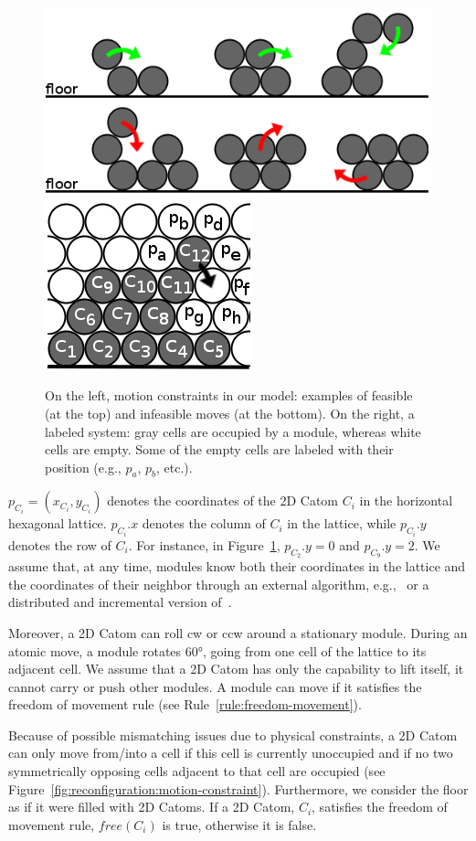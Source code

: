\begin{figure}[!h]
	\centering
	\includegraphics[width=.6\linewidth]{images/reconfiguration/constraints}
	\hfill
	\includegraphics[width=.37\linewidth]{images/reconfiguration/named-system}
	\caption{On the left, motion constraints in our model: examples of feasible (at the top) and infeasible moves (at the bottom). On the right, a labeled system: gray cells are occupied by a module, whereas white cells are empty. Some of the empty cells are labeled with their position (e.g., $p_a$, $p_b$, etc.).}
	\label{fig:reconfiguration:motion-constraint}
	\label{fig:reconfiguration:named-system}
\end{figure}

$p_{C_i} = (x_{C_i},y_{C_i})$ denotes the coordinates of the 2D Catom $C_i$ in the horizontal hexagonal lattice. $p_{C_i}.x$ denotes the column of $C_i$ in the lattice, while $p_{C_i}.y$ denotes the row of $C_i$. For instance, in Figure~\ref{fig:reconfiguration:named-system}, $p_{C_2}.y = 0$ and $p_{C_9}.y = 2$. We assume that, at any time, modules know both their coordinates in the lattice and the coordinates of their neighbor through an external algorithm, e.g.,~\cite{funiak-ijrr08} or a distributed and incremental version of~\cite{moffo2016first}.

Moreover, a 2D Catom can roll \gls{cw} or \gls{ccw} around a stationary module. During an atomic move, a module rotates $60°$, going from one cell of the lattice to its adjacent cell. We assume that a 2D Catom has only the capability to lift itself, it cannot carry or push other modules. A module can move if it satisfies the freedom of movement rule (see Rule~\ref{rule:freedom-movement}).

\begin{myRule}
	\label{rule:freedom-movement}
	Because of possible mismatching issues due to physical constraints, a 2D Catom can only move from/into a cell if this cell is currently unoccupied and if no two symmetrically opposing cells adjacent to that cell are occupied (see Figure~\ref{fig:reconfiguration:motion-constraint}). Furthermore, we consider the floor as if it were filled with 2D Catoms. If a 2D Catom, $C_i$, satisfies the freedom of movement rule, $free(C_i)$ is true, otherwise it is false.
\end{myRule}

